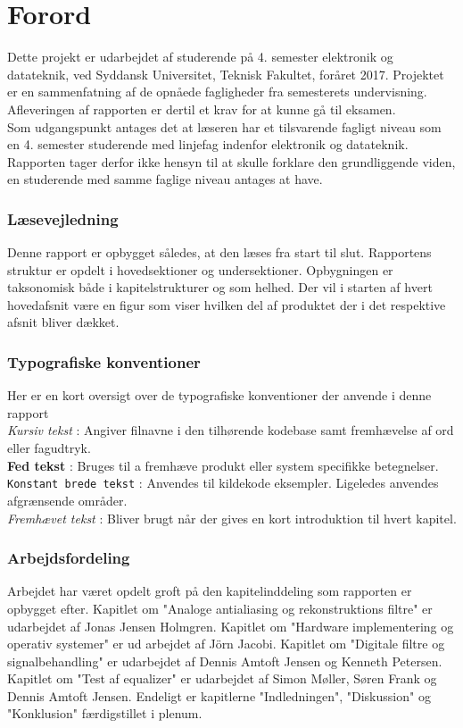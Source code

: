 \chapter*{Forord}\label{chap:forord}

Dette projekt er udarbejdet af studerende på 4. semester elektronik og datateknik, ved Syddansk Universitet, Teknisk Fakultet, foråret 2017. Projektet er en sammenfatning af de opnåede fagligheder fra semesterets undervisning. Afleveringen af rapporten er dertil et krav for at kunne gå til eksamen.\\

Som udgangspunkt antages det at læseren har et tilsvarende fagligt niveau som en 4. semester studerende med linjefag indenfor elektronik og datateknik.
Rapporten tager derfor ikke hensyn til at skulle forklare den grundliggende viden, en studerende med samme faglige niveau antages at have.

\subsection{Læsevejledning}
Denne rapport er opbygget således, at den læses fra start til slut. Rapportens struktur er opdelt i hovedsektioner og undersektioner. Opbygningen er taksonomisk både i kapitelstrukturer og som helhed. Der vil i starten af hvert hovedafsnit være en figur som viser hvilken del af produktet der i det respektive afsnit bliver dækket.

\subsection{Typografiske konventioner}
Her er en kort oversigt over de typografiske konventioner der anvende i denne rapport
\\
\textit{Kursiv tekst} : Angiver filnavne i den tilhørende kodebase samt fremhævelse af ord eller fagudtryk.
\\
\textbf{Fed tekst} : Bruges til a fremhæve produkt eller system specifikke betegnelser.
\\
\texttt{Konstant brede tekst} : Anvendes til kildekode eksempler. Ligeledes anvendes afgrænsende områder. 
\\
\emph{Fremhævet tekst} : Bliver brugt når der gives en kort introduktion til hvert kapitel. 

\subsection{Arbejdsfordeling}
Arbejdet har været opdelt groft på den kapitelinddeling som rapporten er opbygget efter. Kapitlet om "Analoge antialiasing og rekonstruktions filtre" er udarbejdet af Jonas Jensen Holmgren. Kapitlet om "Hardware implementering og operativ systemer" er ud arbejdet af Jörn Jacobi. Kapitlet om "Digitale filtre og signalbehandling" er udarbejdet af Dennis Amtoft Jensen og Kenneth Petersen. Kapitlet om "Test af equalizer" er udarbejdet af Simon Møller, Søren Frank og Dennis Amtoft Jensen. Endeligt er kapitlerne "Indledningen", "Diskussion" og "Konklusion" færdigstillet i plenum.


